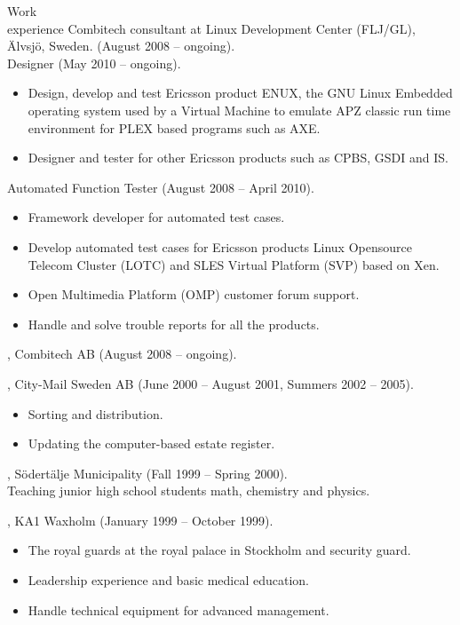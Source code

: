 \documentclass{../../cls/cv}
\author{Samuel Gabrielsson - Curriculum Vitae}
\begin{document}
\maketitle

\begin{category}{Work \\experience}
 Combitech consultant at Linux Development Center (FLJ/GL), \"Alvsj\"o, Sweden. (August 2008 -- ongoing).\\ 
Designer (May 2010 -- ongoing). 
\begin{itemize}
   \item Design, develop and test Ericsson product ENUX, the GNU Linux Embedded operating system used by a Virtual Machine to emulate APZ classic run time environment for PLEX based programs such as AXE.  
   \item Designer and tester for other Ericsson products such as CPBS, GSDI and IS.
\end{itemize}
Automated Function Tester (August 2008 -- April 2010). 
\begin{itemize}
   \item Framework developer for automated test cases. 
   \item Develop automated test cases for Ericsson products Linux Opensource Telecom Cluster (LOTC) and SLES Virtual Platform (SVP) based on Xen.
   \item Open Multimedia Platform (OMP) customer forum support.
   \item Handle and solve trouble reports for all the products.
\end{itemize}

, Combitech AB (August 2008 -- ongoing). 

, City-Mail Sweden AB (June 2000 -- August 2001, Summers 2002 -- 2005). 
\begin{itemize}
   \item Sorting and distribution.
   \item Updating the computer-based estate register.
\end{itemize}

, S\"odert\"alje Municipality (Fall 1999 --
Spring 2000). \\
Teaching junior high school students math, chemistry and physics.

, KA1 Waxholm (January 1999 -- October 1999).
\begin{itemize}
   \item The royal guards at the royal palace in Stockholm and security guard.
   \item Leadership experience and basic medical education.
   \item Handle technical equipment for advanced management.
\end{itemize}
\end{category}
\end{document}
